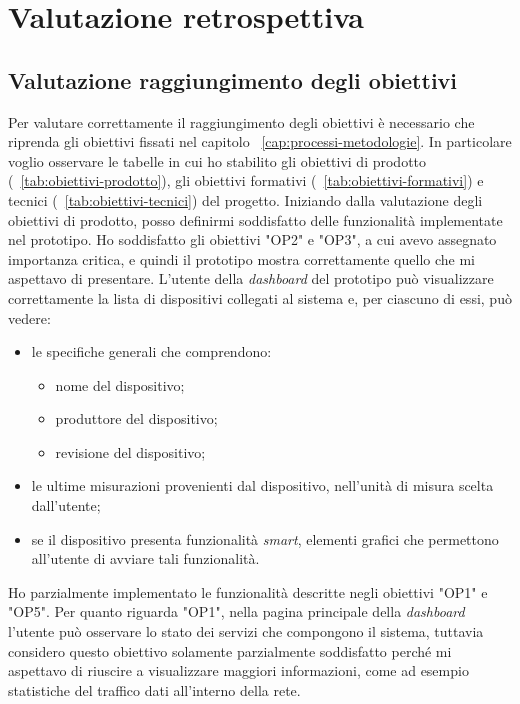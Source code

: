 
\pagebreak
\chapter{Valutazione retrospettiva}
\label{cap:analisi-requisiti}

\section{Valutazione raggiungimento degli obiettivi}

Per valutare correttamente il raggiungimento degli obiettivi è necessario che riprenda gli obiettivi fissati nel capitolo ~\ref{cap:processi-metodologie}.
In particolare voglio osservare le tabelle in cui ho stabilito gli obiettivi di prodotto (~\ref{tab:obiettivi-prodotto}), gli obiettivi formativi (~\ref{tab:obiettivi-formativi}) e tecnici (~\ref{tab:obiettivi-tecnici}) del progetto.
Iniziando dalla valutazione degli obiettivi di prodotto, posso definirmi soddisfatto delle funzionalità implementate nel prototipo.
Ho soddisfatto gli obiettivi "OP2" e "OP3", a cui avevo assegnato importanza critica, e quindi il prototipo mostra correttamente quello che mi aspettavo di presentare.
L'utente della \emph{dashboard} del prototipo può visualizzare correttamente la lista di dispositivi collegati al sistema e, per ciascuno di essi, può vedere:
\begin{itemize}
  \item le specifiche generali che comprendono:
  \begin{itemize}
    \item nome del dispositivo;
    \item produttore del dispositivo;
    \item revisione del dispositivo;
  \end{itemize}
  \item le ultime misurazioni provenienti dal dispositivo, nell'unità di misura scelta dall'utente;
  \item se il dispositivo presenta funzionalità \emph{smart}, elementi grafici che permettono all'utente di avviare tali funzionalità.
\end{itemize}
Ho parzialmente implementato le funzionalità descritte negli obiettivi "OP1" e "OP5".
Per quanto riguarda "OP1", nella pagina principale della \emph{dashboard} l'utente può osservare lo stato dei servizi che compongono il sistema, tuttavia considero questo obiettivo solamente parzialmente soddisfatto perché mi aspettavo di riuscire a visualizzare maggiori informazioni, come ad esempio statistiche del traffico dati all'interno della rete.
